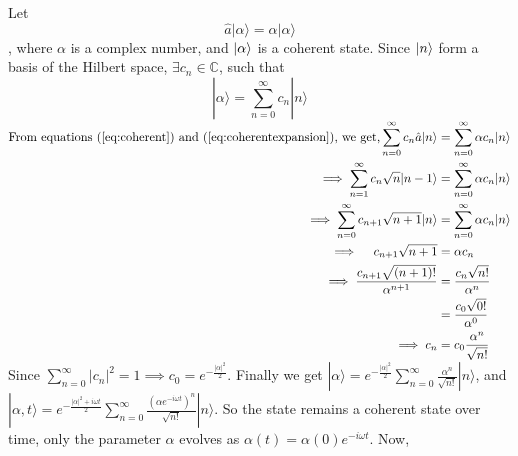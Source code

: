 \documentclass[12pt, twoside]{article}
\begin{document}
Let \begin{equation}\label{eq:coherent}
	\hat {a} | \alpha \rangle = \alpha | \alpha \rangle
\end{equation}, where $\alpha$ is a complex number, and $\ket{\alpha}$ is a coherent state. Since $\ket{n}$ form a basis of the Hilbert space, $\exists c_n \in \mathbb{C}$, such that \begin{equation} \label{eq:coherentexpansion}| \alpha \rangle = \displaystyle\sum _ { n = 0 } ^ { \infty } c_n | n \rangle \end{equation}
$\begin{aligned}\text{From equations (\ref{eq:coherent}) and (\ref{eq:coherentexpansion}), we get,}\displaystyle\sum _ { n = 0 } ^ { \infty } c_ { n } \hat {a} | n \rangle &= \sum _ { n = 0 } ^ { \infty } \alpha c_{ n } | n \rangle\\\implies \sum _ { n = 1 } ^ { \infty } c_{ n } \sqrt { n } | n - 1 \rangle &= \sum _ { n = 0 } ^ { \infty } \alpha c_{ n } | n \rangle \\ \implies \sum _ { n = 0 } ^ { \infty } c _ { n + 1 } \sqrt { n + 1 } | n \rangle &= \sum _ { n = 0 } ^ { \infty } \alpha c _ { n } | n \rangle\\ \implies \quad c _ { n + 1 } \sqrt { n + 1 } &= \alpha c _ { n } \\  \implies \frac { c _ { n + 1 } \sqrt { ( n + 1 ) ! } } { \alpha ^ { n + 1 } }  &= \frac { c _ { n } \sqrt { n ! } } { \alpha ^ { n } } \\  &= \frac { c _ { 0 } \sqrt { 0 ! } } { \alpha ^ { 0 } }  \\ \implies c _ { n } &= c _ { 0 } \frac { \alpha ^ { n } } { \sqrt { n ! } }\end{aligned}$\\
Since $\displaystyle\sum _ { n = 0 } ^ { \infty } \left| c _ { n } \right| ^ { 2 } = 1 \implies c _ { 0 } = e ^ { - \frac { | \alpha | ^ { 2 } } { 2 } }$. Finally we get $\displaystyle| \alpha \rangle = e ^ { - \frac {|\alpha| ^ { 2 } } { 2 } } \sum _ { n = 0 } ^ { \infty } \frac { \alpha ^ { n } } { \sqrt { n ! } } | n \rangle$,
and $\displaystyle| \alpha,t \rangle = e ^ { - \frac {|\alpha| ^ { 2 } + i\omega t} { 2 }} \sum _ { n = 0 } ^ { \infty } \frac { (\alpha e^{-i\omega t})^ { n }  } { \sqrt { n ! } } | n \rangle$. So the state remains a coherent state over time, only the parameter $\alpha$ evolves as $\alpha(t) = \alpha(0) e^{-i\omega t}$.
Now, 
\end{document}
